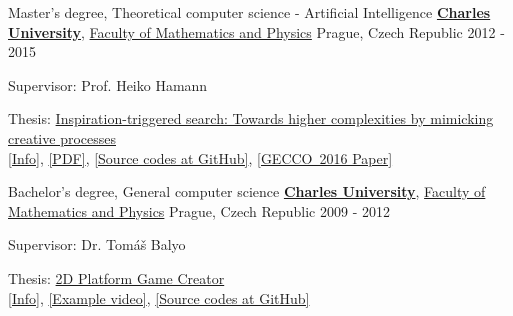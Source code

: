 \begin{cventries}
  \cventry
{Master's degree, Theoretical computer science - Artificial Intelligence} %
{\href{http://cuni.cz}{\textbf{Charles University}}, \href{http://www.mff.cuni.cz}
	{Faculty of Mathematics and Physics}} %
{Prague, Czech Republic} %
{2012 - 2015} %
{
	\begin{cvitems} %
		\item {Supervisor: Prof. Heiko Hamann}
		\item {Thesis: \href{http://milanrybar.cz/inspiration-triggered-search}{Inspiration-triggered search: Towards higher complexities by mimicking creative processes}  \\ \hspace*{2em} 
		\href{http://milanrybar.cz/inspiration-triggered-search}{[Info]}, 
		\href{http://milanrybar.cz/data/ITS/ITS_Thesis.pdf}{[PDF]}, 
		\href{https://github.com/milan-rybar/inspiration-triggered-search}{[Source codes at GitHub]}, 
		\href{http://milanrybar.cz/data/ITS/GECCO2016/ITS_GECCO2016_Paper.pdf}{[GECCO~2016 Paper]}
		}
	\end{cvitems}
}

  \cventry
{Bachelor's degree, General computer science} %
{\href{http://cuni.cz}{\textbf{Charles University}}, \href{http://www.mff.cuni.cz}
	{Faculty of Mathematics and Physics}} %
{Prague, Czech Republic} %
{2009 - 2012} %
{
	\begin{cvitems} %
		\item {Supervisor: Dr. Tomáš Balyo}
		\item {Thesis: \href{http://milanrybar.cz/2pgc}{2D Platform Game Creator} \\ \hspace*{2em} 
		\href{http://milanrybar.cz/2pgc}{[Info]}, 
		\href{https://www.youtube.com/watch?v=WxjpEEXgAvo}{[Example video]}, 
		\href{https://github.com/milan-rybar/2D-Platform-Game-Creator}{[Source codes at GitHub]}
		}
	\end{cvitems}
}

\end{cventries}

